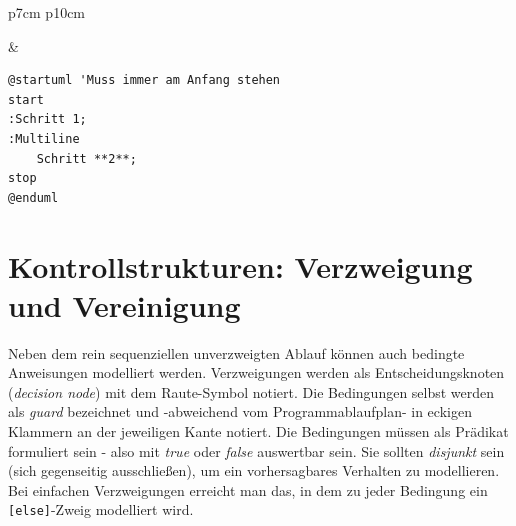 \documentclass[10pt]{scrartcl}
\begin{document}
\begin{tabular}[b]{p{7cm} p{10cm}}
	
	&
	\begin{lstlisting}[style=plantuml]
@startuml 'Muss immer am Anfang stehen
start
:Schritt 1;
:Multiline
	Schritt **2**;
stop
@enduml
	\end{lstlisting}
\end{tabular}


\newpage
\section{Kontrollstrukturen: Verzweigung und Vereinigung}
Neben dem rein sequenziellen unverzweigten Ablauf können auch bedingte Anweisungen modelliert werden. Verzweigungen werden als Entscheidungsknoten (\textit{decision node}) mit dem Raute-Symbol notiert. Die Bedingungen selbst werden als \textit{guard} bezeichnet und -abweichend vom Programmablaufplan- in eckigen Klammern an der jeweiligen Kante notiert. Die Bedingungen müssen als Prädikat formuliert sein - also mit \textit{true} oder \textit{false} auswertbar sein. Sie sollten \textit{disjunkt} sein (sich gegenseitig ausschließen), um ein vorhersagbares Verhalten zu modellieren. Bei einfachen Verzweigungen erreicht man das, in dem zu jeder Bedingung ein \texttt{[else]}-Zweig modelliert wird.
\end{document}
